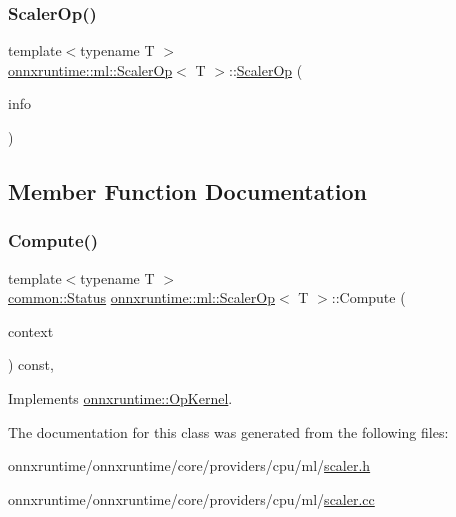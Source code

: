 \subsubsection{\texorpdfstring{Scaler\+Op()}{ScalerOp()}}
{\footnotesize\ttfamily template$<$typename T $>$ \\
\mbox{\hyperlink{classonnxruntime_1_1ml_1_1ScalerOp}{onnxruntime\+::ml\+::\+Scaler\+Op}}$<$ T $>$\+::\mbox{\hyperlink{classonnxruntime_1_1ml_1_1ScalerOp}{Scaler\+Op}} (\begin{DoxyParamCaption}\item[{const \mbox{\hyperlink{classonnxruntime_1_1OpKernelInfo}{Op\+Kernel\+Info}} \&}]{info }\end{DoxyParamCaption})\hspace{0.3cm}{\ttfamily [explicit]}}



\subsection{Member Function Documentation}
\mbox{\label{classonnxruntime_1_1ml_1_1ScalerOp_a7d16dffe1e1b5a5863cbe53c387c292e}} 
\subsubsection{\texorpdfstring{Compute()}{Compute()}}
{\footnotesize\ttfamily template$<$typename T $>$ \\
\mbox{\hyperlink{classonnxruntime_1_1common_1_1Status}{common\+::\+Status}} \mbox{\hyperlink{classonnxruntime_1_1ml_1_1ScalerOp}{onnxruntime\+::ml\+::\+Scaler\+Op}}$<$ T $>$\+::Compute (\begin{DoxyParamCaption}\item[{\mbox{\hyperlink{classonnxruntime_1_1OpKernelContext}{Op\+Kernel\+Context}} $\ast$}]{context }\end{DoxyParamCaption}) const\hspace{0.3cm}{\ttfamily [override]}, {\ttfamily [virtual]}}



Implements \mbox{\hyperlink{classonnxruntime_1_1OpKernel_a9eca8656a78b1b3ab9d3351a12798650}{onnxruntime\+::\+Op\+Kernel}}.



The documentation for this class was generated from the following files\+:\begin{DoxyCompactItemize}
\item 
onnxruntime/onnxruntime/core/providers/cpu/ml/\mbox{\hyperlink{scaler_8h}{scaler.\+h}}\item 
onnxruntime/onnxruntime/core/providers/cpu/ml/\mbox{\hyperlink{scaler_8cc}{scaler.\+cc}}\end{DoxyCompactItemize}
